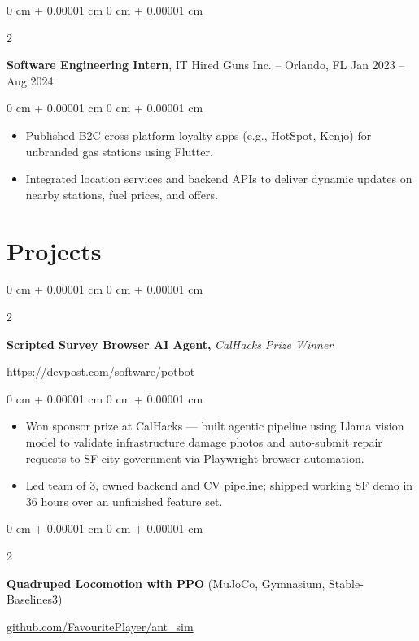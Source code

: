 \documentclass[10pt, letterpaper]{article}
\newenvironment{highlights}{
    \begin{itemize}[
        topsep=0.3 cm,
        parsep=0.05 cm,
        partopsep=0pt,
        itemsep=0pt,
        leftmargin=0 cm + 10pt
    ]
}{
    \end{itemize}
} %
\newenvironment{onecolentry}{
    \begin{adjustwidth}{
        0 cm + 0.00001 cm
    }{
        0 cm + 0.00001 cm
    }
}{
    \end{adjustwidth}
} %
\newenvironment{twocolentry}[2][]{
    \onecolentry
    \def\secondColumn{#2}
    \setcolumnwidth{\fill, 4.5 cm}
    \begin{paracol}{2}
}{
    \switchcolumn \raggedleft \secondColumn
    \end{paracol}
    \endonecolentry
} %
\newenvironment{extendedtwocolentry}[2][]{
    \onecolentry
    \def\secondColumn{#2}
    \setcolumnwidth{\fill, 8 cm}
    \begin{paracol}{2}
}{
    \switchcolumn \raggedleft \secondColumn
    \end{paracol}
    \endonecolentry
}
\begin{document}
        \vspace{0.07 cm}

        \begin{twocolentry}{
            Jan 2023 – Aug 2024
        }
            \textbf{Software Engineering Intern}, IT Hired Guns Inc. -- Orlando, FL\end{twocolentry}

        \vspace{0.07 cm}
        \begin{onecolentry}
            \begin{highlights}
                \item Published B2C cross-platform loyalty apps (e.g., HotSpot, Kenjo) for unbranded gas stations using Flutter.
                \item Integrated location services and backend APIs to deliver dynamic updates on nearby stations, fuel prices, and offers.
            \end{highlights}
        \end{onecolentry}

    \section{Projects}

        \begin{extendedtwocolentry}{
            \href{https://devpost.com/software/potbot}{https://devpost.com/software/potbot}
        }
            \textbf{Scripted Survey Browser AI Agent,} \textit{CalHacks Prize Winner}
        \end{extendedtwocolentry}

        \vspace{0.07 cm}
        \begin{onecolentry}
            \begin{highlights}
                \item Won sponsor prize at CalHacks — built agentic pipeline using Llama vision model to validate infrastructure damage photos and auto-submit repair requests to SF city government via Playwright browser automation.
                \item Led team of 3, owned backend and CV pipeline; shipped working SF demo in 36 hours over an unfinished feature set.
            \end{highlights}
        \end{onecolentry}

        \begin{extendedtwocolentry}{
            \href{https://github.com/FavouritePlayer/ant_sim}{github.com/FavouritePlayer/ant\_sim}
        }
            \textbf{Quadruped Locomotion with PPO} (MuJoCo, Gymnasium, Stable-Baselines3)
        \end{extendedtwocolentry}
\end{document}
